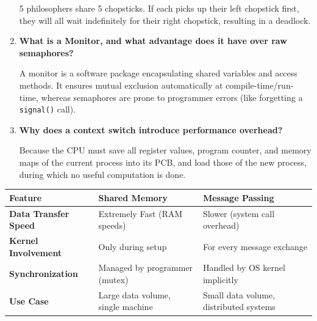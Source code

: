 \documentclass[12pt,a4paper]{article}
\newcommand{\Q}[1]{\textbf{#1}\par\noindent\ignorespaces}
\renewcommand{\arraystretch}{1.45}
\begin{document}
\begin{tcolorbox}[exambox, title={\textbf{Frequently Asked / Viva Questions}}]
\begin{enumerate}[topsep=0pt, label=\textbf{Q\arabic*.}, itemsep=5pt]
    5 philosophers share 5 chopsticks. If each picks up their left chopstick first, they will all wait indefinitely for their right chopstick, resulting in a deadlock.
  \item \Q{What is a Monitor, and what advantage does it have over raw semaphores?}
    A monitor is a software package encapsulating shared variables and access methods. It ensures mutual exclusion automatically at compile-time/run-time, whereas semaphores are prone to programmer errors (like forgetting a \texttt{signal()} call).
  \item \Q{Why does a context switch introduce performance overhead?}
    Because the CPU must save all register values, program counter, and memory maps of the current process into its PCB, and load those of the new process, during which no useful computation is done.
\end{enumerate}
\end{tcolorbox}

\begin{tcolorbox}[tikzbox, title={IPC Models Comparison}]
\renewcommand{\arraystretch}{1.4}
\par\noindent
\begin{tabularx}{\linewidth}{|B{2.2cm}|>{\small\centering\arraybackslash}X|>{\small\centering\arraybackslash}X|}
\hline
\textbf{Feature} & \textbf{\color{myred}Shared Memory} & \textbf{\color{myteal}Message Passing} \\
\hline
\textbf{Data Transfer Speed} & Extremely Fast (RAM speeds) & Slower (system call overhead) \\
\hline
\textbf{Kernel Involvement} & Only during setup & For every message exchange \\
\hline
\textbf{Synchronization} & Managed by programmer (mutex) & Handled by OS kernel implicitly \\
\hline
\textbf{Use Case} & Large data volume, single machine & Small data volume, distributed systems \\
\hline
\end{tabularx}
\end{tcolorbox}
\end{document}
